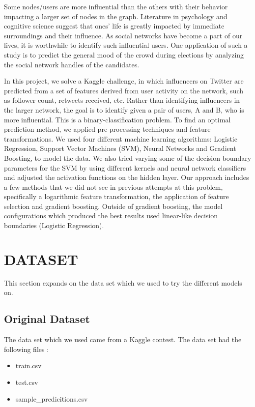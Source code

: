 \documentclass[conference]{IEEEtran}
\numberwithin{equation}{section}
\numberwithin{figure}{section}
\numberwithin{table}{section}
\begin{document}
Some nodes/users are more influential than the others with their behavior impacting a larger set of nodes in the graph. Literature in psychology and cognitive science suggest that ones’ life is greatly impacted by immediate surroundings and their influence. As social networks have become a part of our lives, it is worthwhile to identify such influential users. One application of such a study is to predict the general mood of the crowd during elections by analyzing the social network handles of the candidates.

In this project, we solve a Kaggle\cite{kaggle} challenge, in which influencers on Twitter are predicted from a set of features derived from user activity on the network, such as follower count, retweets received, etc. Rather than identifying influencers in the larger network, the goal is to identify given a pair of users, A and B, who is more influential. This is a binary-classification problem. To find an optimal prediction method, we applied pre-processing techniques and feature transformations. We used four different machine learning algorithms: Logistic Regression, Support Vector Machines (SVM), Neural Networks and Gradient Boosting, to model the data. We also tried varying some of the decision boundary parameters for the SVM by using different kernels and neural network classifiers and adjusted the activation functions on the hidden layer. Our approach includes a few methods that we did not see in previous attempts at this problem, specifically a logarithmic feature transformation, the application of feature selection and gradient boosting. Outside of gradient boosting, the model configurations which produced the best results used linear-like decision boundaries (Logistic Regression).
 
\section{DATASET}\label{sec:page-layout}

This section expands on the data set which we used to try the different models on. 

\subsection{Original Dataset}\label{sec:formatting}
The data set which we used came from a Kaggle contest. The data set had the following files : 
\begin{itemize}
  \item train.csv
  \item test.csv
  \item sample\_predicitions.csv
\end{itemize}
\end{document}
